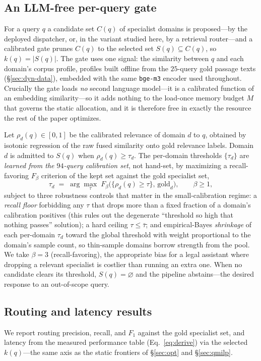 \documentclass[11pt]{article}
\begin{document}
\subsection{An LLM-free per-query gate}
\label{sec:dyn-gate}
For a query $q$ a candidate set $C(q)$ of specialist domains is proposed---by the
deployed dispatcher, or, in the variant studied here, by a retrieval router---and a
calibrated gate prunes $C(q)$ to the selected set $S(q)\subseteq C(q)$, so
$k(q)=|S(q)|$. The gate uses one signal: the similarity between $q$ and each
domain's corpus profile, profiles built offline from the $25$-query gold passage
texts (§\ref{sec:dyn-data}), embedded with the same \texttt{bge-m3} encoder used
throughout. Crucially the gate loads \emph{no} second language model---it is a
calibrated function of an embedding similarity---so it adds nothing to the load-once
memory budget $M$ that governs the static allocation, and it is therefore free in
exactly the resource the rest of the paper optimizes.

Let $\rho_d(q)\in[0,1]$ be the calibrated relevance of domain $d$ to $q$, obtained
by isotonic regression of the raw fused similarity onto gold relevance labels.
Domain $d$ is admitted to $S(q)$ when $\rho_d(q)\ge\tau_d$. The per-domain
thresholds $\{\tau_d\}$ are \emph{learned from the $94$-query calibration set}, not
hand-set, by maximizing a recall-favoring $F_\beta$ criterion of the kept set
against the gold specialist set,
\begin{equation}
\tau_d \;=\; \arg\max_{\tau}\; F_\beta\!\big(\{\rho_d(q)\ge\tau\},\,\mathrm{gold}_d\big),
\qquad \beta\ge 1,
\label{eq:fbeta}
\end{equation}
subject to three robustness controls that matter in the small-calibration regime:
a \emph{recall floor} forbidding any $\tau$ that drops more than a fixed fraction of
a domain's calibration positives (this rules out the degenerate ``threshold so high
that nothing passes'' solution); a hard ceiling $\tau\le\bar\tau$; and
empirical-Bayes \emph{shrinkage} of each per-domain $\tau_d$ toward the global
threshold with weight proportional to the domain's sample count, so thin-sample
domains borrow strength from the pool. We take $\beta=3$ (recall-favoring), the
appropriate bias for a legal assistant where dropping a relevant specialist is
costlier than running an extra one. When no candidate clears its threshold,
$S(q)=\varnothing$ and the pipeline abstains---the desired response to an
out-of-scope query.

\subsection{Routing and latency results}
\label{sec:dyn-results}
We report routing precision, recall, and $F_1$ against the gold specialist set, and
latency from the measured performance table (Eq.~\ref{eq:derive}) via the selected
$k(q)$---the same axis as the static frontiers of §\ref{sec:opt} and
§\ref{sec:qmilp}.
\end{document}
